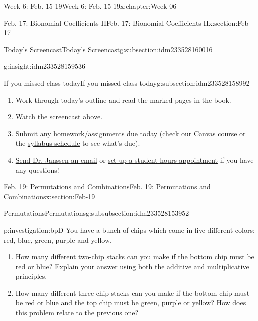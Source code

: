\documentclass[oneside,10pt,]{book}
\numberwithin{equation}{section}
\begin{document}
\begin{chapterptx}{Week 6: Feb. 15-19}{}{Week 6: Feb. 15-19}{}{}{x:chapter:Week-06}
\begin{sectionptx}{Feb. 17: Bionomial Coefficients II}{}{Feb. 17: Bionomial Coefficients II}{}{}{x:section:Feb-17}
\begin{subsectionptx}{Today's Screencast}{}{Today's Screencast}{}{}{g:subsection:idm233528160016}
\begin{insight}{}{g:insight:idm233528159536}
\end{insight}
\end{subsectionptx}
%
%
\typeout{************************************************}
\typeout{************************************************}
%
\begin{subsectionptx}{If you missed class today}{}{If you missed class today}{}{}{g:subsection:idm233528158992}
%
\begin{enumerate}
\item{}Work through today's outline and read the marked pages in the book.%
\item{}Watch the screencast above.%
\item{}Submit any homework\slash{}assignments due today (check our \href{https://dordt.instructure.com/courses/3110050}{Canvas course} or the \href{https://prof.mkjanssen.org/ds/index.html\#schedule}{syllabus schedule} to see what's due).%
\item{}\href{mailto:mike.janssen@dordt.edu}{Send Dr. Janssen an email} or \href{https://calendly.com/mkjanssen/student-hours}{set up a student hours appointment} if you have any questions!%
\end{enumerate}
\end{subsectionptx}
\end{sectionptx}
%
%
\typeout{************************************************}
\typeout{************************************************}
%
\begin{sectionptx}{Feb. 19: Permutations and Combinations}{}{Feb. 19: Permutations and Combinations}{}{}{x:section:Feb-19}
%
%
\typeout{************************************************}
\typeout{************************************************}
%
\begin{subsubsectionptx}{Permutations}{}{Permutations}{}{}{g:subsubsection:idm233528153952}
\begin{investigation}{}{p:investigation:bpD}%
You have a bunch of chips which come in five different colors: red, blue, green, purple and yellow.%
\begin{enumerate}
\item{}How many different two-chip stacks can you make if the bottom chip must be red or blue? Explain your answer using both the additive and multiplicative principles.%
\item{}How many different three-chip stacks can you make if the bottom chip must be red or blue and the top chip must be green, purple or yellow? How does this problem relate to the previous one?%

\end{enumerate}
\end{investigation}
\end{subsubsectionptx}
\end{sectionptx}
\end{chapterptx}
\end{document}
